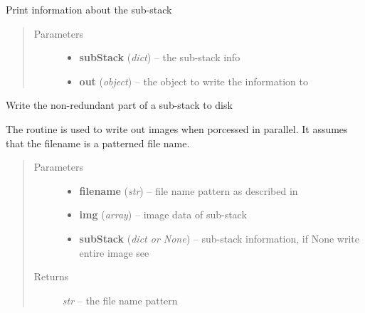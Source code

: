 \documentclass[letterpaper,10pt,english]{sphinxmanual}
\begin{document}
\begin{fulllineitems}
\label{api/ClearMap.ImageProcessing:ClearMap.ImageProcessing.StackProcessing.printSubStackInfo}
Print information about the sub-stack
\begin{quote}\begin{description}
\item[{Parameters}] \leavevmode\begin{itemize}
\item {} 
\textbf{subStack} (\emph{dict}) --
the sub-stack info

\item {} 
\textbf{out} (\emph{object}) --
the object to write the information to

\end{itemize}

\end{description}\end{quote}

\end{fulllineitems}


\begin{fulllineitems}
\label{api/ClearMap.ImageProcessing:ClearMap.ImageProcessing.StackProcessing.writeSubStack}
Write the non-redundant part of a sub-stack to disk

The routine is used to write out images when porcessed in parallel.
It assumes that the filename is a patterned file name.
\begin{quote}\begin{description}
\item[{Parameters}] \leavevmode\begin{itemize}
\item {} 
\textbf{filename} (\emph{str}) --
file name pattern as described in

\item {} 
\textbf{img} (\emph{array}) --
image data of sub-stack

\item {} 
\textbf{subStack} (\emph{dict or None}) --
sub-stack information, if None write entire image
see 

\end{itemize}

\item[{Returns}] \leavevmode
\emph{str} --
the file name pattern

\end{description}\end{quote}

\end{fulllineitems}
\end{document}
